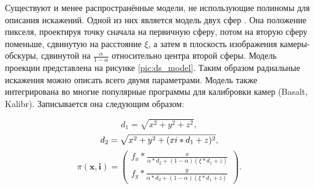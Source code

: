 Существуют и менее распространённые модели, не использующие полиномы для описания искажений. Одной из них является
модель двух сфер \cite{double_sphere}. %
Она положение пикселя, проектируя точку сначала на первичную сферу, потом на вторую сферу поменьше, сдвинутую на 
расстояние $\xi$, а затем в плоскость изображения камеры-обскуры, сдвинутой на $\frac{\alpha}{1-\alpha}$ относительно 
центра второй сферы. Модель проекции представлена на рисунке \ref{pic:ds_model}. Таким образом радиальные искажения 
можно описать всего двумя параметрами. Модель также интегрирована
во многие популярные программы для калибровки камер (Basalt, Kalibr). Записывается она следующим образом:
\begin{eqseries}
    \begin{equation}	
        d_1 = \sqrt{x^2+y^2+z^2}, 
    \end{equation}
    \begin{equation}	
        d_2 = \sqrt{x^2+y^2+(\\xi*d_1+z)^2 }, 
    \end{equation}
    \begin{equation}	
        \pi(\mathbf{x}, \mathbf{i}) = \begin{pmatrix}f_x * \frac{x}{\alpha*d_2+(1-\alpha)(\xi*d_1+z)} \\
                                                    f_y * \frac{y}{\alpha*d_2+(1-\alpha)(\xi*d_1+z)} \end{pmatrix}.
        \label{eqn:ds}
    \end{equation}
\end{eqseries}

